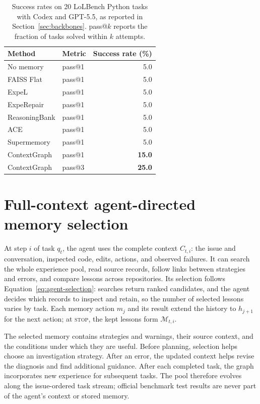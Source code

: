 \begin{table}[htbp]
\centering
\caption{Success rates on 20 LoLBench Python tasks with Codex and GPT-5.5,
as reported in Section~\ref{sec:backbones}.
pass@$k$ reports the fraction of tasks solved within $k$ attempts.}
\label{tab:new-codex55}
\begin{tabular}{llr}
\toprule
Method & Metric & Success rate (\%) \\
\midrule
No memory & pass@1 & 5.0 \\
FAISS Flat & pass@1 & 5.0 \\
ExpeL & pass@1 & 5.0 \\
ExpeRepair & pass@1 & 5.0 \\
ReasoningBank & pass@1 & 5.0 \\
ACE & pass@1 & 5.0 \\
Supermemory & pass@1 & 5.0 \\
ContextGraph & pass@1 & \textbf{15.0} \\
\midrule
ContextGraph & pass@3 & \textbf{25.0} \\
\bottomrule
\end{tabular}
\end{table}

\clearpage
\section{Full-context agent-directed memory selection}
\label{sec:agentic-retrieval}
At step $i$ of task $q_t$, the agent uses the complete context $C_{t,i}$: the issue and
conversation, inspected code, edits, actions, and observed failures. It can
search the whole experience pool, read source records, follow links between
strategies and errors, and compare lessons across repositories. Its selection
follows Equation~\ref{eq:agent-selection}: searches return ranked
candidates, and the agent decides which records to inspect and retain, so the
number of selected lessons varies by task. Each memory action $m_j$ and its
result extend the history to $h_{j+1}$ for the next action; at
\textsc{stop}, the kept lessons form $\mathcal M_{t,i}$.

The selected memory contains strategies and warnings, their source context,
and the conditions under which they are useful. Before planning, selection
helps choose an investigation strategy. After an error, the updated context
helps revise the diagnosis and find additional guidance. After each completed
task, the graph incorporates new experience for subsequent tasks.
The pool therefore evolves along the issue-ordered task stream; official
benchmark test results are never part of the agent's context or stored memory.
